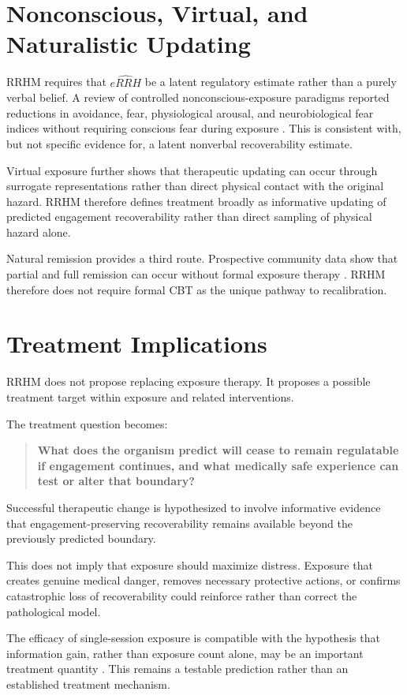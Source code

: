 \documentclass[11pt]{article}
\begin{document}
\section{Nonconscious, Virtual, and Naturalistic Updating}
RRHM requires that $\widehat{eRRH}$ be a latent regulatory estimate rather than a purely verbal belief. A review of controlled nonconscious-exposure paradigms reported reductions in avoidance, fear, physiological arousal, and neurobiological fear indices without requiring conscious fear during exposure \cite{siegel2025}. This is consistent with, but not specific evidence for, a latent nonverbal recoverability estimate.

Virtual exposure further shows that therapeutic updating can occur through surrogate representations rather than direct physical contact with the original hazard. RRHM therefore defines treatment broadly as informative updating of predicted engagement recoverability rather than direct sampling of physical hazard alone.

Natural remission provides a third route. Prospective community data show that partial and full remission can occur without formal exposure therapy \cite{trumpf2009remission}. RRHM therefore does not require formal CBT as the unique pathway to recalibration.

\section{Treatment Implications}
RRHM does not propose replacing exposure therapy. It proposes a possible treatment target within exposure and related interventions.

The treatment question becomes:
\begin{quote}
\textbf{What does the organism predict will cease to remain regulatable if engagement continues, and what medically safe experience can test or alter that boundary?}
\end{quote}

Successful therapeutic change is hypothesized to involve informative evidence that engagement-preserving recoverability remains available beyond the previously predicted boundary.

This does not imply that exposure should maximize distress. Exposure that creates genuine medical danger, removes necessary protective actions, or confirms catastrophic loss of recoverability could reinforce rather than correct the pathological model.

The efficacy of single-session exposure is compatible with the hypothesis that information gain, rather than exposure count alone, may be an important treatment quantity \cite{odgers2022}. This remains a testable prediction rather than an established treatment mechanism.
\end{document}
